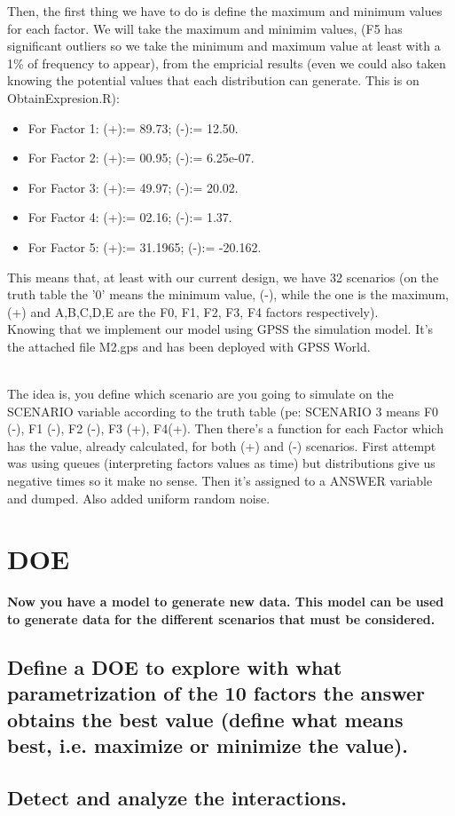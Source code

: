 \documentclass[12pt]{article}
\begin{document}
\hfill%
\begin{minipage}{0.6\textwidth}\raggedright
 Then, the first thing we have to do is define the maximum and minimum values for each factor. We will take the maximum and minimim values, (F5 has significant outliers so we take the minimum and maximum value at least with a 1\% of frequency to appear), from the empricial results (even we could also taken knowing the potential values that each distribution can generate. This is on ObtainExpresion.R):\\
\begin{itemize}
\item For Factor 1: (+):= 89.73; (-):= 12.50.
\item For Factor 2: (+):= 00.95; (-):= 6.25e-07.
\item For Factor 3: (+):= 49.97; (-):= 20.02.
\item For Factor 4: (+):= 02.16; (-):= 1.37.
\item For Factor 5: (+):= 31.1965; (-):= -20.162.
\end{itemize}
This means that, at least with our current design, we have 32 scenarios (on the truth table the '0' means the minimum value, (-), while the one is the maximum, (+) and A,B,C,D,E are the F0, F1, F2, F3, F4 factors respectively).\\
Knowing that we implement our model using GPSS the simulation model. It's the attached file M2.gps and has been deployed with GPSS World.\\
\end{minipage}
\\The idea is, you define which scenario are you going to simulate on the SCENARIO variable according to the truth table (pe: SCENARIO 3 means F0 (-), F1 (-), F2 (-), F3 (+), F4(+). Then there's a function for each Factor which has the value, already calculated, for both (+) and (-) scenarios. First attempt was using queues (interpreting factors values as time) but distributions give us negative times so it make no sense. Then it's assigned to a ANSWER variable and dumped. Also added uniform random noise.


\section {DOE}
\vspace{5mm}
\textbf{Now you have a model to generate new data. This model can be used to generate data for the different scenarios that must be considered.}
\subsection {Define a DOE to explore with what parametrization of the 10 factors the answer obtains the best value (define what means best, i.e. maximize or minimize the value).}
\subsection {Detect and analyze the interactions.}
\end{document}
